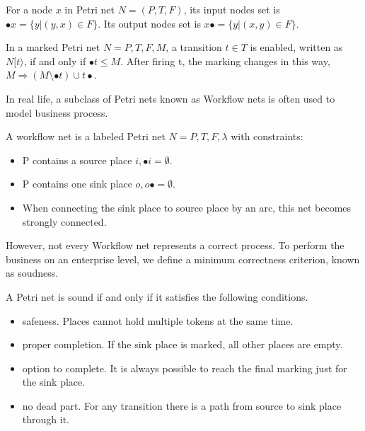 \begin{definition}
	For a node $x$ in Petri net $N=(P,T,F)$, its input nodes set is $\bullet x = \{y\vert (y,x)\in F\}$. Its output nodes set is $x\bullet = \{y\vert (x,y)\in F\}$.
\end{definition}
\begin{definition}
	In a marked Petri net $N={P,T,F,M}$, a transition $t\in T$ is enabled, written as $N[t\rangle$, if and only if $\bullet t \leq M$. After firing t, the marking changes in this way, $M \Rightarrow (M\setminus\bullet t)\cup t\bullet$.
\end{definition}
In real life, a subclass of Petri nets known as Workflow nets is often used to model business process.
\begin{definition}
	A workflow net is a labeled Petri net $N={P,T,F,\lambda}$ with constraints: 
	\begin{itemize}
		\itemsep0em 
		\item P contains a source place $i, \bullet i=\emptyset$.
		\item P contains one sink place $o, o\bullet =\emptyset$.
		\item When connecting the sink place to source place by an arc, this net becomes strongly connected.
	\end{itemize}
\end{definition}   
However, not every Workflow net represents a correct process. To perform the business on an enterprise level, we define a minimum correctness criterion, known as soudness\cite{van2006structural}. 
\begin{definition}[Soundness]
	A Petri net is sound if and only if it satisfies the following conditions.
	\begin{itemize}
		\itemsep0em 
		\item safeness. Places cannot hold multiple tokens at the same time.
		\item proper completion. If the sink place is marked, all other places are empty.
		\item option to complete. It is always possible to reach the final marking just for the sink place.
		\item no dead part. For any transition there is a path from source to sink place through it. 
	\end{itemize}
\end{definition}

